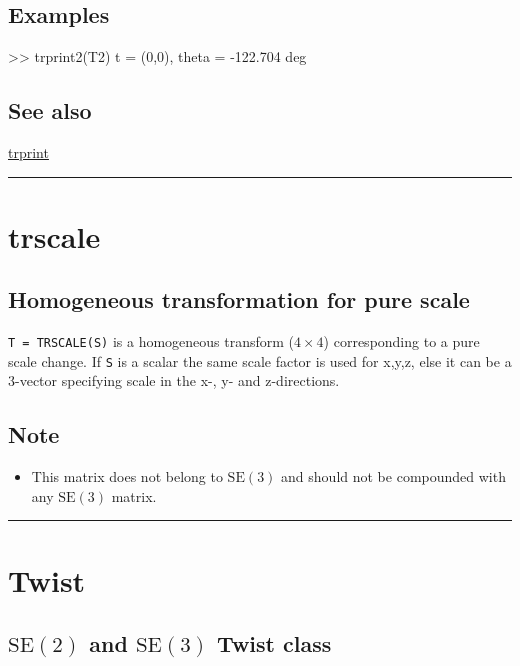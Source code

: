\subsection*{Examples}
\begin{Code}
  >> trprint2(T2)
  t = (0,0), theta = -122.704 deg

\end{Code}

\subsection*{See also}


\hyperlink{trprint}{\color{blue} trprint}

\vspace{1.5ex}\rule{\textwidth}{1mm}

\hypertarget{trscale}{\section*{trscale}}
\subsection*{Homogeneous transformation for pure scale}


\texttt{T = TRSCALE(S)} is a homogeneous transform ($4 \times 4$) corresponding to a pure
scale change.  If \texttt{S} is a scalar the same scale factor is used for x,y,z,
else it can be a 3-vector specifying scale in the x-, y- and
z-directions.


\subsection*{Note}
\begin{itemize}
  \item This matrix does not belong to $\mbox{SE}(3)$ and should not be compounded with    any $\mbox{SE}(3)$ matrix.
\end{itemize}
\vspace{1.5ex}\rule{\textwidth}{1mm}

\hypertarget{Twist}{\section*{Twist}}
\subsection*{$\mbox{SE}(2)$ and $\mbox{SE}(3)$ Twist class}


